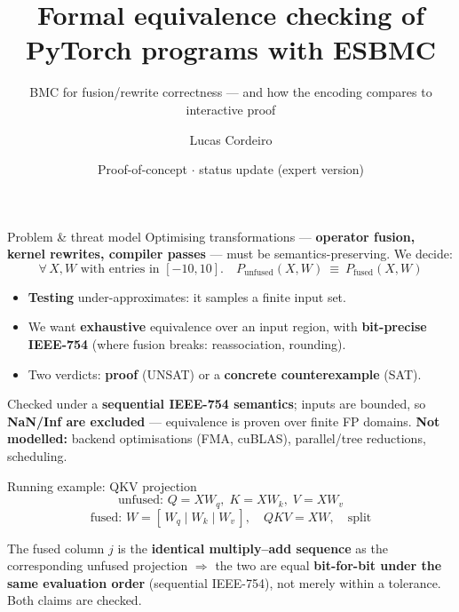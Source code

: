 \documentclass[aspectratio=169,11pt]{beamer}
\title[PyTorch $\equiv$ checking with ESBMC]{Formal equivalence checking of PyTorch programs with ESBMC}
\subtitle{BMC for fusion/rewrite correctness --- and how the encoding compares to interactive proof}
\date{Proof-of-concept $\cdot$ status update (expert version)}
\author{Lucas Cordeiro}
\institute{University of Manchester}
\begin{document}
{
}

\begin{frame}{Problem \& threat model}
  Optimising transformations --- \textbf{operator fusion, kernel rewrites, compiler passes} ---
  must be semantics-preserving. We decide:
  \[ \forall\, X, W \text{ with entries in } [-10,10].\quad P_{\text{unfused}}(X,W)\ \equiv\ P_{\text{fused}}(X,W) \]
  \begin{itemize}
    \item \textbf{Testing} under-approximates: it samples a finite input set.
    \item We want \textbf{exhaustive} equivalence over an input region, with
      \textbf{bit-precise IEEE-754} (where fusion breaks: reassociation, rounding).
    \item Two verdicts: \textbf{proof} (UNSAT) or a \textbf{concrete counterexample} (SAT).
  \end{itemize}
  \medskip
  {\footnotesize Checked under a \textbf{sequential IEEE-754 semantics}; inputs are bounded, so
  \textbf{NaN/Inf are excluded} --- equivalence is proven over finite FP domains.
  \textbf{Not modelled:} backend optimisations (FMA, cuBLAS), parallel/tree reductions, scheduling.}
\end{frame}

\begin{frame}{Running example: QKV projection}
  \[
    \text{unfused: } Q = XW_q,\; K = XW_k,\; V = XW_v
  \]
  \[
    \text{fused: } W = [\,W_q \mid W_k \mid W_v\,],\quad \mathit{QKV}=XW,\quad \text{split}
  \]

  \bigskip
  The fused column $j$ is the \textbf{identical multiply--add sequence} as the corresponding
  unfused projection $\Rightarrow$ the two are equal \textbf{bit-for-bit under the same
  evaluation order} (sequential IEEE-754), not merely within a tolerance. Both claims are checked.
\end{frame}
\end{document}

